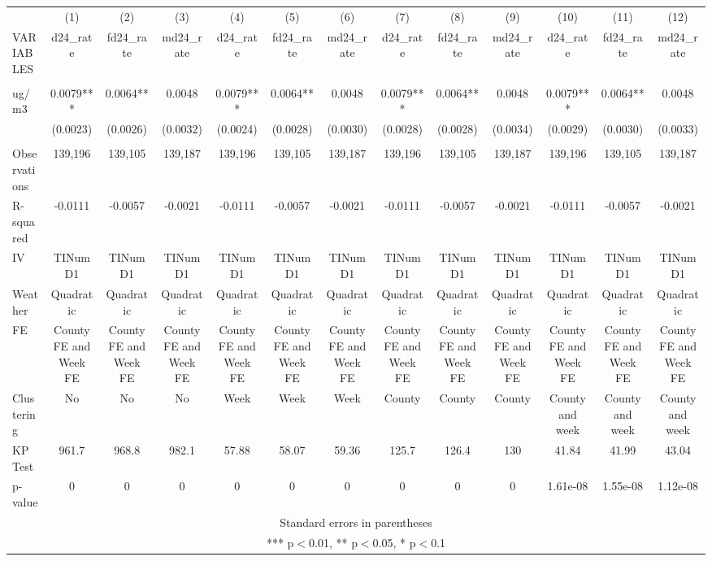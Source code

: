 \begin{tabular}{lcccccccccccc} \hline
 & (1) & (2) & (3) & (4) & (5) & (6) & (7) & (8) & (9) & (10) & (11) & (12) \\
VARIABLES & d24\_rate & fd24\_rate & md24\_rate & d24\_rate & fd24\_rate & md24\_rate & d24\_rate & fd24\_rate & md24\_rate & d24\_rate & fd24\_rate & md24\_rate \\ \hline
 &  &  &  &  &  &  &  &  &  &  &  &  \\
ug/m3 & 0.0079*** & 0.0064** & 0.0048 & 0.0079*** & 0.0064** & 0.0048 & 0.0079*** & 0.0064** & 0.0048 & 0.0079*** & 0.0064** & 0.0048 \\
 & (0.0023) & (0.0026) & (0.0032) & (0.0024) & (0.0028) & (0.0030) & (0.0028) & (0.0028) & (0.0034) & (0.0029) & (0.0030) & (0.0033) \\
 &  &  &  &  &  &  &  &  &  &  &  &  \\
Observations & 139,196 & 139,105 & 139,187 & 139,196 & 139,105 & 139,187 & 139,196 & 139,105 & 139,187 & 139,196 & 139,105 & 139,187 \\
R-squared & -0.0111 & -0.0057 & -0.0021 & -0.0111 & -0.0057 & -0.0021 & -0.0111 & -0.0057 & -0.0021 & -0.0111 & -0.0057 & -0.0021 \\
IV & TINumD1 & TINumD1 & TINumD1 & TINumD1 & TINumD1 & TINumD1 & TINumD1 & TINumD1 & TINumD1 & TINumD1 & TINumD1 & TINumD1 \\
Weather & Quadratic & Quadratic & Quadratic & Quadratic & Quadratic & Quadratic & Quadratic & Quadratic & Quadratic & Quadratic & Quadratic & Quadratic \\
FE & County FE and Week FE & County FE and Week FE & County FE and Week FE & County FE and Week FE & County FE and Week FE & County FE and Week FE & County FE and Week FE & County FE and Week FE & County FE and Week FE & County FE and Week FE & County FE and Week FE & County FE and Week FE \\
Clustering & No & No & No & Week & Week & Week & County & County & County & County and week & County and week & County and week \\
KP Test & 961.7 & 968.8 & 982.1 & 57.88 & 58.07 & 59.36 & 125.7 & 126.4 & 130 & 41.84 & 41.99 & 43.04 \\
 p-value & 0 & 0 & 0 & 0 & 0 & 0 & 0 & 0 & 0 & 1.61e-08 & 1.55e-08 & 1.12e-08 \\ \hline
\multicolumn{13}{c}{ Standard errors in parentheses} \\
\multicolumn{13}{c}{ *** p$<$0.01, ** p$<$0.05, * p$<$0.1} \\
\end{tabular}
